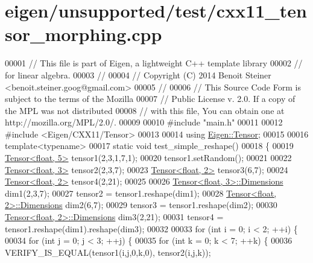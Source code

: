 \hypertarget{eigen_2unsupported_2test_2cxx11__tensor__morphing_8cpp_source}{}\section{eigen/unsupported/test/cxx11\+\_\+tensor\+\_\+morphing.cpp}
\label{eigen_2unsupported_2test_2cxx11__tensor__morphing_8cpp_source}

\begin{DoxyCode}
00001 \textcolor{comment}{// This file is part of Eigen, a lightweight C++ template library}
00002 \textcolor{comment}{// for linear algebra.}
00003 \textcolor{comment}{//}
00004 \textcolor{comment}{// Copyright (C) 2014 Benoit Steiner <benoit.steiner.goog@gmail.com>}
00005 \textcolor{comment}{//}
00006 \textcolor{comment}{// This Source Code Form is subject to the terms of the Mozilla}
00007 \textcolor{comment}{// Public License v. 2.0. If a copy of the MPL was not distributed}
00008 \textcolor{comment}{// with this file, You can obtain one at http://mozilla.org/MPL/2.0/.}
00009 
00010 \textcolor{preprocessor}{#include "main.h"}
00011 
00012 \textcolor{preprocessor}{#include <Eigen/CXX11/Tensor>}
00013 
00014 \textcolor{keyword}{using} \hyperlink{class_eigen_1_1_tensor}{Eigen::Tensor};
00015 
00016 \textcolor{keyword}{template}<\textcolor{keyword}{typename}>
00017 \textcolor{keyword}{static} \textcolor{keywordtype}{void} test\_simple\_reshape()
00018 \{
00019   \hyperlink{class_eigen_1_1_tensor}{Tensor<float, 5>} tensor1(2,3,1,7,1);
00020   tensor1.setRandom();
00021 
00022   \hyperlink{class_eigen_1_1_tensor}{Tensor<float, 3>} tensor2(2,3,7);
00023   \hyperlink{class_eigen_1_1_tensor}{Tensor<float, 2>} tensor3(6,7);
00024   \hyperlink{class_eigen_1_1_tensor}{Tensor<float, 2>} tensor4(2,21);
00025 
00026   \hyperlink{class_eigen_1_1_tensor}{Tensor<float, 3>::Dimensions} dim1(2,3,7);
00027   tensor2 = tensor1.reshape(dim1);
00028   \hyperlink{class_eigen_1_1_tensor}{Tensor<float, 2>::Dimensions} dim2(6,7);
00029   tensor3 = tensor1.reshape(dim2);
00030   \hyperlink{class_eigen_1_1_tensor}{Tensor<float, 2>::Dimensions} dim3(2,21);
00031   tensor4 = tensor1.reshape(dim1).reshape(dim3);
00032 
00033   \textcolor{keywordflow}{for} (\textcolor{keywordtype}{int} i = 0; i < 2; ++i) \{
00034     \textcolor{keywordflow}{for} (\textcolor{keywordtype}{int} j = 0; j < 3; ++j) \{
00035       \textcolor{keywordflow}{for} (\textcolor{keywordtype}{int} k = 0; k < 7; ++k) \{
00036         VERIFY\_IS\_EQUAL(tensor1(i,j,0,k,0), tensor2(i,j,k));

\end{DoxyCode}
